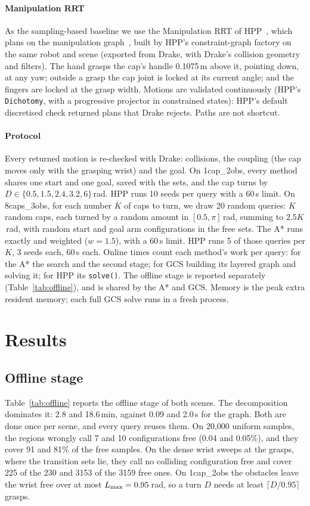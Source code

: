 \paragraph{Manipulation RRT} As the sampling-based baseline we use the
Manipulation RRT of HPP~\cite{mirabel2016hpp}, which plans on the manipulation
graph~\cite{simeon2004manipulation}, built by HPP's constraint-graph factory on
the same robot and scene (exported from Drake, with Drake's collision
geometry and filters). The hand grasps the cap's handle 0.1075\,m above it,
pointing down, at any yaw; outside a grasp the cap joint is locked at its
current angle; and the fingers are locked at the grasp width. Motions are
validated continuously (HPP's \texttt{Dichotomy}, with a progressive projector
in constrained states): HPP's default discretised check returned plans that
Drake rejects. Paths are not shortcut.

\paragraph{Protocol} Every returned motion is re-checked with Drake: collisions,
the coupling (the cap moves only with the grasping wrist) and the goal. On
\textsf{1cap\_2obs}, every method shares one start and one goal, saved with the
sets, and the cap turns by $D\in\{0.5,1.5,2.4,3.2,6\}$\,rad. HPP runs 10 seeds
per query with a 60\,s limit. On \textsf{8caps\_3obs}, for each number $K$ of
caps to turn, we draw 20 random queries: $K$ random caps, each turned by a
random amount in $[0.5,\pi]$\,rad, summing to $2.5K$\,rad, with random start
and goal arm configurations in the free sets. The A* runs exactly and weighted
($w=1.5$), with a 60\,s limit. HPP runs 5 of those queries per $K$, 3 seeds
each, 60\,s each. Online times count each method's work per query: for the A*
the search and the second stage; for GCS building its layered graph and
solving it; for HPP its \texttt{solve()}. The offline stage is reported
separately (Table~\ref{tab:offline}), and is shared by the A* and GCS. Memory
is the peak extra resident memory; each full GCS solve runs in a fresh process.

\section{Results}
\label{sec:results}

\subsection{Offline stage}
Table~\ref{tab:offline} reports the offline stage of both scenes. The
decomposition dominates it: 2.8 and 18.6\,min, against 0.09 and 2.0\,s
for the graph. Both are done once per scene, and every query reuses
them. On 20{,}000 uniform samples, the regions wrongly call 7 and 10
configurations free (0.04 and 0.05\%), and they cover 91 and 81\% of the free
samples. On the dense wrist sweeps at the grasps, where the transition sets
lie, they call no colliding configuration free and cover 225 of the 230 and
3153 of the 3159 free ones. On \textsf{1cap\_2obs} the obstacles leave the
wrist free over at most $L_{\max}=0.95$\,rad, so a turn $D$ needs at least
$\lceil D/0.95\rceil$ grasps.

